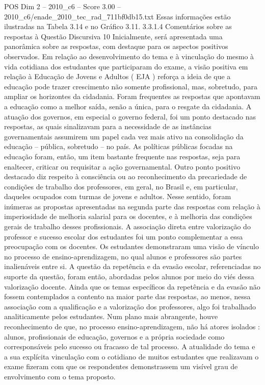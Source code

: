 \begin{textsample}{POS Dim 2 – 2010\_c6 – Score 3.00 – 2010\_c6/enade\_2010\_tec\_rad\_711bf0db15.txt}
Essas informações estão ilustradas na Tabela 3.14 e no Gráfico 3.11. 3.3.1.4 Comentários sobre as respostas à Questão Discursiva 10 Inicialmente, será apresentada uma panorâmica sobre as respostas, com destaque para os aspectos positivos observados.
Em relação ao desenvolvimento do tema e à vinculação do mesmo à vida cotidiana dos estudantes que participaram do exame, a visão positiva em relação à Educação de Jovens e Adultos ( EJA ) reforça a ideia de que a educação pode trazer crescimento não somente profissional, mas, sobretudo, para ampliar os horizontes da cidadania.
Foram frequentes as respostas que apontavam a educação como a melhor saída, senão a única, para o resgate da cidadania.
A atuação dos governos, em especial o governo federal, foi um ponto destacado nas respostas, as quais sinalizavam para a necessidade de as instâncias governamentais assumirem um papel cada vez mais ativo na consolidação da educação – pública, sobretudo – no país.
As políticas públicas focadas na educação foram, então, um item bastante frequente nas respostas, seja para enaltecer, criticar ou requisitar a ação governamental.
Outro ponto positivo destacado diz respeito à consciência ou ao reconhecimento da precariedade de condições de trabalho dos professores, em geral, no Brasil e, em particular, daqueles ocupados com turmas de jovens e adultos.
Nesse sentido, foram inúmeras as propostas apresentadas na segunda parte das respostas com relação à imperiosidade de melhoria salarial para os docentes, e à melhoria das condições gerais de trabalho desses profissionais.
A associação direta entre valorização do professor e sucesso escolar dos estudantes foi um ponto complementar a essa preocupação com os docentes.
Os estudantes demonstraram uma visão de vínculo no processo de ensino-aprendizagem, no qual alunos e professores são partes inalienáveis entre si.
A questão da repetência e da evasão escolar, referenciadas no suporte da questão, foram então, abordadas pelos alunos por meio do viés dessa valorização docente.
Ainda que os temas específicos da repetência e da evasão não fossem contemplados a contento na maior parte das respostas, ao menos, nessa associação com a qualificação e a valorização dos professores, algo foi trabalhado analiticamente pelos estudantes.
Num plano mais abrangente, houve reconhecimento de que, no processo ensino-aprendizagem, não há atores isolados : alunos, profissionais de educação, governos e a própria sociedade como corresponsáveis pelo sucesso ou fracasso de tal processo.
A atualidade do tema e a sua explícita vinculação com o cotidiano de muitos estudantes que realizavam o exame fizeram com que os respondentes demonstrassem um visível grau de envolvimento com o tema proposto.

\end{textsample}
